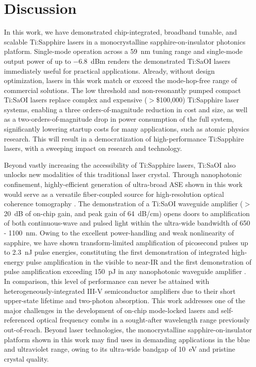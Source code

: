 \documentclass[amsmath, amsthm, amssymb, aps, prb, superscriptaddress, twocolumn, nofootinbib, 10pt]{revtex4-1}%
\begin{document}
\section{Discussion}
In this work, we have demonstrated chip-integrated, broadband tunable, and scalable Ti:Sapphire lasers in a monocrystalline sapphire-on-insulator photonics platform. Single-mode operation across a 59~nm tuning range and single-mode output power of up to $-6.8$~dBm renders the demonstrated Ti:SaOI lasers immediately useful for practical applications. Already, without design optimization, lasers in this work match or exceed the mode-hop-free range of commercial solutions. The low threshold and non-resonantly pumped compact Ti:SaOI lasers  replace complex and expensive ($>$\$100,000) Ti:Sapphire laser systems, enabling a three orders-of-magnitude reduction in cost and size, as well as a two-orders-of-magnitude drop in power consumption of the full system, significantly lowering startup costs for many applications, such as atomic physics research. This will result in a democratization of high-performance Ti:Sapphire lasers, with a sweeping impact on research and technology. 

Beyond vastly increasing the accessibility of Ti:Sapphire lasers, Ti:SaOI also unlocks new modalities of this traditional laser crystal. Through nanophotonic confinement, highly-efficient generation of ultra-broad ASE shown in this work would serve as a versatile fiber-coupled source for high-resolution optical coherence tomography \cite{bouma2022optical}. The demonstration of a Ti:SaOI waveguide amplifier ($>$ 20~dB of on-chip gain, and peak gain of 64~dB/cm) opens doors to amplification of both continuous-wave and pulsed light within the ultra-wide bandwidth of 650 - 1100~nm. Owing to the excellent power-handling and weak nonlinearity of sapphire, we have shown transform-limited amplification of picosecond pulses up to 2.3~nJ pulse energies, constituting the first demonstration of integrated high-energy pulse amplification in the visible to near-IR and the first demonstration of pulse amplification exceeding 150~pJ in any nanophotonic waveguide amplifier \cite{liu2022photonic, shtyrkova2019integrated}. In comparison, this level of performance can never be attained with heterogeneously-integrated III-V semiconductor amplifiers due to their short upper-state lifetime\cite{girardin1998gain} and two-photon absorption\cite{ahmad2008energy}. This work addresses one of the major challenges in the development of on-chip mode-locked lasers and self-referenced optical frequency combs in a sought-after wavelength range previously out-of-reach\cite{newman2019architecture, spencer2018optical}. Beyond laser technologies, the monocrystalline sapphire-on-insulator platform shown in this work may find uses in demanding applications in the blue and ultraviolet range, owing to its ultra-wide bandgap of 10~eV and pristine crystal quality\cite{he2023ultra}.
\end{document}
